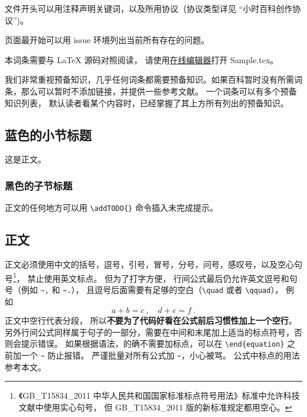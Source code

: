 
文件开头可以用注释声明关键词，以及所用协议（协议类型详见 “小时百科创作协议”)。

页面最开始可以用 issue 环境列出当前所有存在的问题。
\begin{issues}
\issueDraft       %
\issueTODO        %
\issueMissDepend  %
\issueAbstract    %
\issueNeedCite    %
\issueAi          %
\issueAiRaw       %
\end{issues}


本词条需要与 LaTeX 源码对照阅读， 请使用\href{https://wuli.wiki/editor}{在线编辑器}打开 Sample.tex。

我们非常重视预备知识，几乎任何词条都需要预备知识。如果百科暂时没有所需词条，那么可以暂时不添加链接，并提供一些参考文献。 一个词条可以有多个预备知识列表， 默认读者看某个内容时，已经掌握了其上方所有列出的预备知识。

\subsection{蓝色的小节标题}
这是正文。
\subsubsection{黑色的子节标题}
正文的任何地方可以用 \verb|\addTODO{}| 命令插入未完成提示。

\subsection{正文}\label{sub_Sample_16}
正文必须使用中文的括号，逗号，引号，冒号，分号，问号，感叹号，以及空心句号\footnote{《GB\_T15834\_2011 中华人民共和国国家标准标点符号用法》标准中允许科技文献中使用实心句号， 但 GB\_T15834\_2011 版的新标准规定都用空心。}， 禁止使用英文标点。 但为了打字方便， 行间公式最后仍允许英文逗号和句号（例如 \verb|~,| 和 \verb|~.|）， 且逗号后面需要有足够的空白（\verb|\quad| 或者 \verb|\qquad|）， 例如
\begin{equation}\label{eq_Sample_2}
a + b = c~, \quad d + e = f~.
\end{equation}
正文中空行代表分段， 所以\textbf{不要为了代码好看在公式前后习惯性加上一个空行}。 另外行间公式同样属于句子的一部分，需要在中间和末尾加上适当的标点符号，否则会提示错误。 如果根据语法，的确不需要加标点，可以在 \verb|\end{equation}| 之前加一个 \verb|~| 防止报错。 严谨批量对所有公式加 \verb|~|，小心被骂。 公式中标点的用法参考本文。

